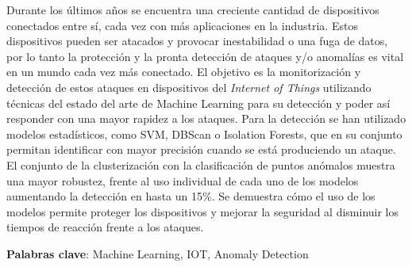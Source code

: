Durante los últimos años se encuentra una creciente cantidad de dispositivos conectados entre sí, cada vez con más aplicaciones en la industria. Estos dispositivos pueden ser atacados y provocar inestabilidad o una fuga de datos, por lo tanto la protección y la pronta detección de ataques y/o anomalías es vital en un mundo cada vez más conectado. El objetivo es la monitorización y detección de estos ataques en dispositivos del \textit{Internet of Things} utilizando técnicas del estado del arte de Machine Learning para su detección y poder así responder con una mayor rapidez a los ataques. Para la detección se han utilizado modelos estadísticos, como SVM, DBScan o Isolation Forests, que en su conjunto permitan identificar con mayor precisión cuando se está produciendo un ataque. El conjunto de la clusterización con la clasificación de puntos anómalos muestra una mayor robustez, frente al uso individual de cada uno de los modelos aumentando la detección en hasta un 15\%. Se demuestra cómo el uso de los modelos permite proteger los dispositivos y mejorar la seguridad al disminuir los tiempos de reacción frente a los ataques.

\vspace{0.5cm}
\textbf{Palabras clave}: Machine Learning, IOT, Anomaly Detection